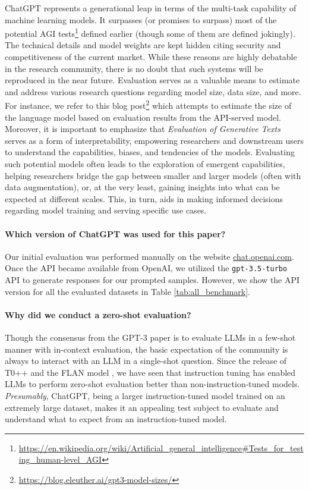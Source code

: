 \documentclass[11pt]{article}
\begin{document}
ChatGPT represents a generational leap in terms of the multi-task capability of machine learning models. It surpasses (or promises to surpass) most of the potential AGI tests\footnote{\url{https://en.wikipedia.org/wiki/Artificial_general_intelligence\#Tests_for_testing_human-level_AGI}} defined earlier (though some of them are defined jokingly). The technical details and model weights are kept hidden citing security and competitiveness \cite{openai2023gpt4} of the current market. While these reasons are highly debatable in the research community, there is no doubt that such systems will be reproduced in the near future. Evaluation serves as a valuable means to estimate and address various research questions regarding model size, data size, and more. For instance, we refer to this blog post\footnote{\url{https://blog.eleuther.ai/gpt3-model-sizes/}} which attempts to estimate the size of the language model based on evaluation results from the API-served model. Moreover, it is important to emphasize that \emph{Evaluation of Generative Texts} serves as a form of interpretability, empowering researchers and downstream users to understand the capabilities, biases, and tendencies of the models. Evaluating such potential models often leads to the exploration of emergent capabilities, helping researchers bridge the gap between smaller and larger models (often with data augmentation), or, at the very least, gaining insights into what can be expected at different scales. This, in turn, aids in making informed decisions regarding model training and serving specific use cases.

\paragraph{Which version of ChatGPT was used for this paper?}

Our initial evaluation was performed manually on the website \url{chat.openai.com}. Once the API became available from OpenAI, we utilized the \texttt{gpt-3.5-turbo} API to generate responses for our prompted samples. However, we show the API version for all the evaluated datasets in Table \ref{tab:all_benchmark}.

\paragraph{Why did we conduct a zero-shot evaluation?}
Though the consensus from the GPT-3 paper \cite{GPT3} is to evaluate LLMs in a few-shot manner with in-context evaluation, the basic expectation of the community is always to interact with an LLM in a single-shot question. Since the release of T0++ \cite{T0} and the FLAN model \cite{FLAN}, we have seen that instruction tuning has enabled LLMs to perform zero-shot evaluation better than non-instruction-tuned models. \textit{Presumably}, ChatGPT, being a larger instruction-tuned model trained on an extremely large dataset, makes it an appealing test subject to evaluate and understand what to expect from an instruction-tuned model.
\end{document}
